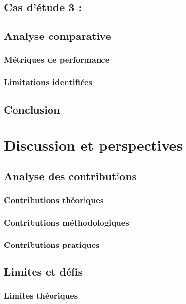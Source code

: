 \documentclass[a4paper,12pt]{article}
\begin{document}
\subsection{Cas d'étude 3 :}
\label{sec:orgde45a9e}

\subsection{Analyse comparative}
\label{sec:orgb621d09}
\subsubsection{Métriques de performance}
\label{sec:orga4feaff}
\subsubsection{Limitations identifiées}
\label{sec:org4b3ccc4}
\subsection{Conclusion}
\label{sec:orgfa39bb9}
\clearpage
\section{Discussion et perspectives}
\label{sec:org9b5d79b}
\subsection{Analyse des contributions}
\label{sec:org8cf3218}
\subsubsection{Contributions théoriques}
\label{sec:org954d99b}
\subsubsection{Contributions méthodologiques}
\label{sec:org13e4d19}
\subsubsection{Contributions pratiques}
\label{sec:org33bfc5f}
\subsection{Limites et défis}
\label{sec:org96a757f}
\subsubsection{Limites théoriques}
\label{sec:org3951e71}
\end{document}
